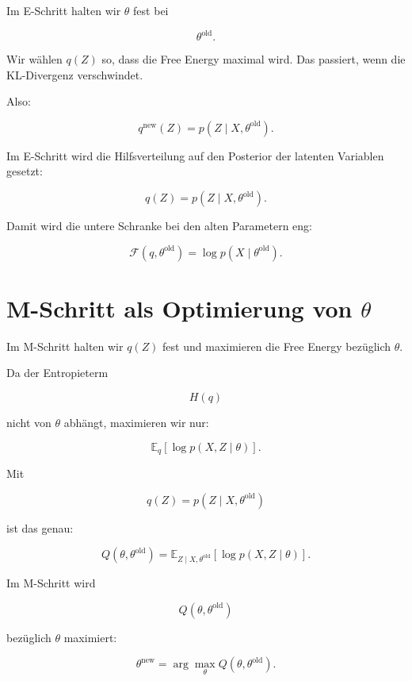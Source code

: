 Im E-Schritt halten wir \(\theta\) fest bei

\[
    \theta^{\mathrm{old}}.
\]

Wir wählen \(q(Z)\) so, dass die Free Energy maximal wird.
Das passiert, wenn die KL-Divergenz verschwindet.

Also:

\[
    q^{\mathrm{new}}(Z)
    =
    p(Z\mid X,\theta^{\mathrm{old}}).
\]

\begin{definitionbox}
Im E-Schritt wird die Hilfsverteilung auf den Posterior der latenten Variablen gesetzt:

\[
    q(Z)
    =
    p(Z\mid X,\theta^{\mathrm{old}}).
\]
\end{definitionbox}

Damit wird die untere Schranke bei den alten Parametern eng:

\[
    \mathcal{F}(q,\theta^{\mathrm{old}})
    =
    \log p(X\mid\theta^{\mathrm{old}}).
\]

\section{M-Schritt als Optimierung von \(\theta\)}

Im M-Schritt halten wir \(q(Z)\) fest und maximieren die Free Energy bezüglich \(\theta\).

Da der Entropieterm

\[
    H(q)
\]

nicht von \(\theta\) abhängt, maximieren wir nur:

\[
    \mathbb{E}_{q}
    [
        \log p(X,Z\mid\theta)
    ].
\]

Mit

\[
    q(Z)
    =
    p(Z\mid X,\theta^{\mathrm{old}})
\]

ist das genau:

\[
    Q(\theta,\theta^{\mathrm{old}})
    =
    \mathbb{E}_{Z\mid X,\theta^{\mathrm{old}}}
    [
        \log p(X,Z\mid\theta)
    ].
\]

\begin{definitionbox}
Im M-Schritt wird

\[
    Q(\theta,\theta^{\mathrm{old}})
\]

bezüglich \(\theta\) maximiert:

\[
    \theta^{\mathrm{new}}
    =
    \arg\max_{\theta}
    Q(\theta,\theta^{\mathrm{old}}).
\]
\end{definitionbox}

